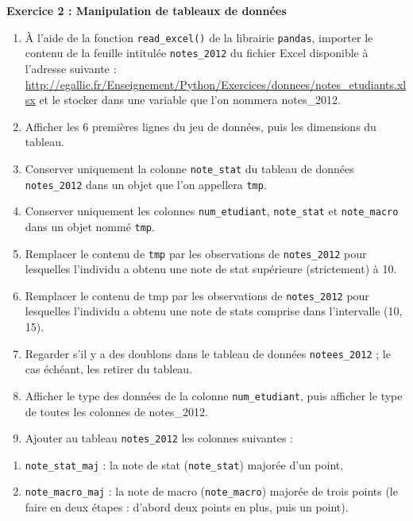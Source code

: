 \documentclass[
  12pt,
]{book}
\makeatletter
\providecommand{\tightlist}{%
  \setlength{\itemsep}{0pt}\setlength{\parskip}{0pt}}
\numberwithin{equation}{section}
\numberwithin{countremarque}{section}
\newenvironment{exframe}{%
 \def\at@end@of@exframe{}%
 \ifinner\ifhmode%
  \def\at@end@of@exframe{\end{minipage}}%
  \begin{minipage}{\columnwidth}%
 \fi\fi%
 \def\FrameCommand##1{\hskip\@totalleftmargin \hskip-\fboxsep
 \colorbox{shadecolorex}{##1}\hskip-\fboxsep
     \hskip-\linewidth \hskip-\@totalleftmargin \hskip\columnwidth}%
 \MakeFramed {\advance\hsize-\width
   \@totalleftmargin\z@ \linewidth\hsize
   \@setminipage}}%
 {\par\unskip\endMakeFramed%
 \at@end@of@exframe}
\makeatother
\begin{document}
\begin{exframe}
\textbf{Exercice 2 : Manipulation de tableaux de données}

\begin{enumerate}
\def\labelenumi{\arabic{enumi}.}
\tightlist
\item
  À l'aide de la fonction \texttt{read\_excel()} de la librairie \texttt{pandas}, importer le contenu de la feuille intitulée \texttt{notes\_2012} du fichier Excel disponible à l'adresse suivante : \url{http://egallic.fr/Enseignement/Python/Exercices/donnees/notes_etudiants.xlsx} et le stocker dans une variable que l'on nommera notes\_2012.
\item
  Afficher les 6 premières lignes du jeu de données, puis les dimensions du tableau.
\item
  Conserver uniquement la colonne \texttt{note\_stat} du tableau de données \texttt{notes\_2012} dans un objet que l'on appellera \texttt{tmp}.
\item
  Conserver uniquement les colonnes \texttt{num\_etudiant}, \texttt{note\_stat} et \texttt{note\_macro} dans un objet nommé \texttt{tmp}.
\item
  Remplacer le contenu de \texttt{tmp} par les observations de \texttt{notes\_2012} pour lesquelles l'individu a obtenu une note de stat supérieure (strictement) à 10.
\item
  Remplacer le contenu de tmp par les observations de \texttt{notes\_2012} pour lesquelles l'individu a obtenu une note de stats comprise dans l'intervalle (10, 15).
\item
  Regarder s'il y a des doublons dans le tableau de données \texttt{notees\_2012} ; le cas échéant, les retirer du tableau.
\item
  Afficher le type des données de la colonne \texttt{num\_etudiant}, puis afficher le type de toutes les colonnes de notes\_2012.
\item
  Ajouter au tableau \texttt{notes\_2012} les colonnes suivantes :
\end{enumerate}

\begin{enumerate}
\def\labelenumi{(\alph{enumi})}
\tightlist
\item
  \texttt{note\_stat\_maj} : la note de stat (\texttt{note\_stat}) majorée d'un point,
\item
  \texttt{note\_macro\_maj} : la note de macro (\texttt{note\_macro}) majorée de trois points (le faire en deux étapes : d'abord deux points en plus, puis un point).
\end{enumerate}


\end{exframe}
\end{document}
